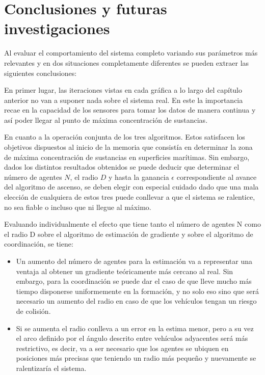 
\chapter{Conclusiones y futuras investigaciones}
\label{ch:chapter4}

Al evaluar el comportamiento del sistema completo variando sus parámetros más relevantes y en dos situaciones completamente diferentes se pueden extraer las siguientes conclusiones:

En primer lugar, las iteraciones vistas en cada gráfica a lo largo del capítulo anterior no van a suponer nada sobre el sistema real. En este la importancia recae en la capacidad de los sensores para tomar los datos de manera continua y así poder llegar al punto de máxima concentración de sustancias.

En cuanto a la operación conjunta de los tres algoritmos. Estos satisfacen los objetivos dispuestos al inicio de la memoria que consistía en determinar la zona de máxima concentración de sustancias en superficies marítimas. Sin embargo, dados los distintos resultados obtenidos se puede deducir que determinar el número de agentes $N$, el radio $D$ y hasta la ganancia $\epsilon$ correspondiente al avance del algoritmo de ascenso, se deben elegir con especial cuidado dado que una mala elección de cualquiera de estos tres puede conllevar a que el sistema se ralentice, no sea fiable o incluso que ni llegue al máximo.

Evaluando individualmente el efecto que tiene tanto el número de agentes N como el radio D sobre el algoritmo de estimación de gradiente y sobre el algoritmo de coordinación, se tiene:

\begin{itemize}
	\item Un aumento del número de agentes para la estimación va a representar una ventaja al obtener un gradiente teóricamente más cercano al real. Sin embargo, para la coordinación se puede dar el caso de que lleve mucho más tiempo disponerse uniformemente en la formación, y no solo eso sino que será necesario un aumento del radio en caso de que los vehículos tengan un riesgo de colisión.
	\item Si se aumenta el radio conlleva a un error en la estima menor, pero a su vez el arco definido por el ángulo descrito entre vehículos adyacentes será más restrictivo, es decir, va a ser necesario que los agentes se ubiquen en posiciones más precisas que teniendo un radio más pequeño y nuevamente se ralentizaría el sistema.
\end{itemize} 

